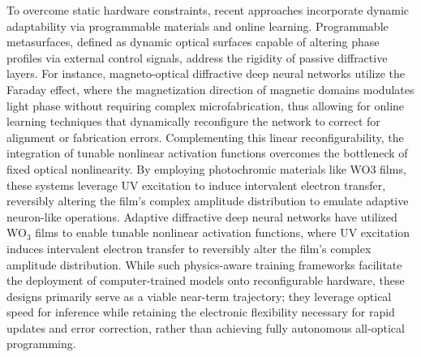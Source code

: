 To overcome static hardware constraints, recent approaches incorporate dynamic adaptability via programmable materials and online learning. Programmable metasurfaces, defined as dynamic optical surfaces capable of altering phase profiles via external control signals, address the rigidity of passive diffractive layers. For instance, magneto-optical diffractive deep neural networks utilize the Faraday effect, where the magnetization direction of magnetic domains modulates light phase without requiring complex microfabrication, thus allowing for online learning techniques that dynamically reconfigure the network to correct for alignment or fabrication errors. Complementing this linear reconfigurability, the integration of tunable nonlinear activation functions overcomes the bottleneck of fixed optical nonlinearity. By employing photochromic materials like WO3 films, these systems leverage UV excitation to induce intervalent electron transfer, reversibly altering the film's complex amplitude distribution to emulate adaptive neuron-like operations. Adaptive diffractive deep neural networks have utilized WO\(_{3}\) films to enable tunable nonlinear activation functions, where UV excitation induces intervalent electron transfer to reversibly alter the film's complex amplitude distribution. \citep{doi_10_1002_lpor_202500558_72fd7a4f} While such physics-aware training frameworks facilitate the deployment of computer-trained models onto reconfigurable hardware, these designs primarily serve as a viable near-term trajectory; they leverage optical speed for inference while retaining the electronic flexibility necessary for rapid updates and error correction, rather than achieving fully autonomous all-optical programming. \citep{s2_44f5e5b7573063092084a20caab78ea8a4e2407e_dd441649} \citep{doi_10_1002_lpor_202500558_72fd7a4f} \citep{doi_10_1002_lpor_202200348_d54cae18}

